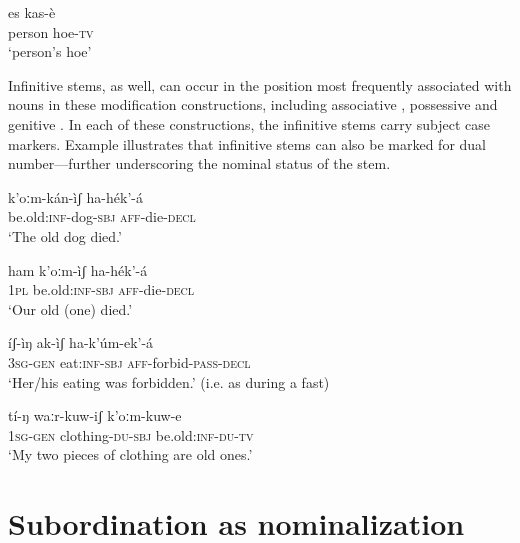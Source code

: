\documentclass[output=paper]{langsci/langscibook}
\begin{document}
\ea\label{ex:mahland:28}
\gll es         kas-è  \\
person   hoe\textsc{{}-tv}\\
\glt `person's hoe'
\z

Infinitive stems, as well, can occur in the position most frequently associated with nouns in these modification constructions, including associative , possessive  and genitive . In each of these constructions, the infinitive stems carry subject case markers. Example  illustrates that infinitive stems can also be marked for dual number—further underscoring the nominal status of the stem.  

\ea\label{ex:mahland:29}
\gll k'oːm-kán-ìʃ           ha-hék'-{\downstep}á        \\
be.old:\textsc{inf}{}-dog-\textsc{sbj}   \textsc{aff}{}-die-\textsc{decl} \\
\glt `The old dog died.'
\z

\ea\label{ex:mahland:30}
\gll ham    k'oːm-ìʃ           ha-hék'-{\downstep}á      \\
\textsc{1pl}     be.old:\textsc{inf-sbj}  \textsc{aff}{}-die-\textsc{decl} \\
\glt `Our old (one) died.' 
\z

\ea\label{ex:mahland:31}
\gll íʃ-ìŋ          ak-ìʃ            ha-k'úm-{\downstep}ek'-á  \\
\textsc{3sg-gen}    eat:\textsc{inf-sbj}   \textsc{aff}{}-forbid-\textsc{pass-decl}\\
\glt `Her/his eating was forbidden.'  (i.e. as during a fast)
\z

\ea\label{ex:mahland:32}
\gll tí-ŋ            waːr-kuw-iʃ         k'oːm-kuw-e   \\
\textsc{1sg-gen}   clothing-\textsc{du-sbj}   be.old:\textsc{inf-du-tv}\\
\glt `My two pieces of clothing are old ones.'
\z

\section{Subordination as nominalization}\label{sec:mahland:2}
\end{document}

